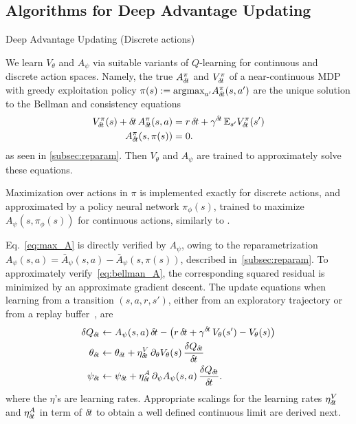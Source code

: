 \subsection{Algorithms for Deep Advantage Updating}
\label{subsec:algorithm}
\begin{algorithm}[ht]
  \caption{Deep Advantage Updating (Discrete actions)}
  \label{alg:dau}
	
\end{algorithm}

We learn $V_{\theta}$ and $A_{\psi}$ via suitable variants of $Q$-learning for continuous and
discrete action spaces. Namely, 
the true $A^\pi_{\delta\hspace{-.1em}t}$
and $V^\pi_{\delta\hspace{-.1em}t}$ of a near-continuous MDP with greedy exploitation
policy $\pi(s) \mathrel{\mathop{:}}=
\text{argmax}_{a'}A^\pi_{\delta\hspace{-.1em}t}(s, a')$
are the unique solution to the Bellman and consistency equations
\begin{align}
	V^{\pi}_{\delta\hspace{-.1em}t}(s) + {\delta\hspace{-.1em}t}\, A^{\pi}_{\delta\hspace{-.1em}t}(s, a) &=
	r\,{\delta\hspace{-.1em}t} + \gamma^{{\delta\hspace{-.1em}t}}  \,\mathbb{E}_{s'} V^{\pi}_{\delta\hspace{-.1em}t}(s')\label{eq:bellman_A}\\
	A^{\pi}_{\delta\hspace{-.1em}t}(s, \pi(s)) &= 0\label{eq:max_A}.
\end{align}
as seen in \ref{subsec:reparam}. Then $V_{\theta}$
and $A_{\psi}$ are trained to approximately solve these equations.

Maximization over actions in $\pi$ is implemented exactly for discrete actions,
and approximated by a policy neural network $\pi_\phi(s)$, trained to maximize $A_\psi(s,
\pi_\phi(s))$ for continuous actions, similarly to
\cite{ddpg}.

Eq.~\eqref{eq:max_A}
is directly verified by $A_{\psi}$, owing to the reparametrization
$A_\psi(s, a) = \bar{A}_\psi(s, a) - \bar{A}_\psi(s, \pi(s))$, described
in~\ref{subsec:reparam}.  To approximately verify~\eqref{eq:bellman_A}, the
corresponding squared residual is minimized by an approximate gradient descent.
The update equations when learning from a transition $(s, a, r, s')$, either from
an exploratory trajectory or from a replay buffer~\cite{dqn}, are
\begin{align}
	\delta Q_{\delta\hspace{-.1em}t} &\leftarrow A_\psi(s, a)\, {\delta\hspace{-.1em}t} - \left(r
	\,{\delta\hspace{-.1em}t} + \gamma^{{\delta\hspace{-.1em}t}}\, V_\theta(s') - V_\theta(s)\right)
	\label{eq:approx_deltaQ}\\
	\theta_{\delta\hspace{-.1em}t} &\leftarrow \theta_{\delta\hspace{-.1em}t} + \eta^V_{\delta\hspace{-.1em}t}
	\,\partial_{\theta} V_\theta(s) \,\frac{\delta Q_{\delta\hspace{-.1em}t}}{{\delta\hspace{-.1em}t}}
	\label{eq:approx_bellman_V}\\
	\psi_{\delta\hspace{-.1em}t} &\leftarrow \psi_{\delta\hspace{-.1em}t} + \eta^A_{\delta\hspace{-.1em}t}
	\,\partial_{\psi} A_\psi(s, a) \,\frac{\delta Q_{\delta\hspace{-.1em}t}}{{\delta\hspace{-.1em}t}}.
	\label{eq:approx_bellman_A}
\end{align} 
where the $\eta$'s are learning rates.
Appropriate scalings for the learning rates $\eta^V_{\delta\hspace{-.1em}t}$ and
$\eta^A_{\delta\hspace{-.1em}t}$ in term of ${\delta\hspace{-.1em}t}$ to obtain a well defined continuous
limit are derived next.

